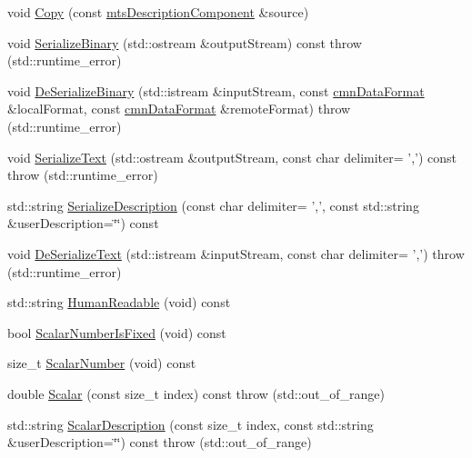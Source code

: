 \begin{DoxyCompactItemize}
\item 
void \hyperlink{classmts_description_component_ad1d9aff865eb1daed3bda3f9d8ef88cb}{Copy} (const \hyperlink{classmts_description_component}{mts\-Description\-Component} \&source)
\item 
void \hyperlink{classmts_description_component_a12686c859e5cbad6352ec8d68c2dbc4e}{Serialize\-Binary} (std\-::ostream \&output\-Stream) const   throw (std\-::runtime\-\_\-error)
\item 
void \hyperlink{classmts_description_component_a2850dacd32cba75f6c01e7fcfa1aa160}{De\-Serialize\-Binary} (std\-::istream \&input\-Stream, const \hyperlink{classcmn_data_format}{cmn\-Data\-Format} \&local\-Format, const \hyperlink{classcmn_data_format}{cmn\-Data\-Format} \&remote\-Format)  throw (std\-::runtime\-\_\-error)
\item 
void \hyperlink{classmts_description_component_acdd6d7340d4d00cbb5b2701e2483efeb}{Serialize\-Text} (std\-::ostream \&output\-Stream, const char delimiter= ',') const   throw (std\-::runtime\-\_\-error)
\item 
std\-::string \hyperlink{classmts_description_component_a55bb05d2657cd88eaba5489acb14319b}{Serialize\-Description} (const char delimiter= ',', const std\-::string \&user\-Description=\char`\"{}\char`\"{}) const 
\item 
void \hyperlink{classmts_description_component_a33a54263087078a20600405194952726}{De\-Serialize\-Text} (std\-::istream \&input\-Stream, const char delimiter= ',')  throw (std\-::runtime\-\_\-error)
\item 
std\-::string \hyperlink{classmts_description_component_aec77d1543d1350ba27609d841c5b2db3}{Human\-Readable} (void) const 
\item 
bool \hyperlink{classmts_description_component_a94598766098a636192e4e9b08a57794f}{Scalar\-Number\-Is\-Fixed} (void) const 
\item 
size\-\_\-t \hyperlink{classmts_description_component_ab6c67105fd3c72538fd7bb46a7e25a16}{Scalar\-Number} (void) const 
\item 
double \hyperlink{classmts_description_component_a28f72fc4c53d6e540b355b1aa4675dfa}{Scalar} (const size\-\_\-t index) const   throw (std\-::out\-\_\-of\-\_\-range)
\item 
std\-::string \hyperlink{classmts_description_component_a07911fc4526c4d0fe5f545282dd47956}{Scalar\-Description} (const size\-\_\-t index, const std\-::string \&user\-Description=\char`\"{}\char`\"{}) const   throw (std\-::out\-\_\-of\-\_\-range)
\end{DoxyCompactItemize}
